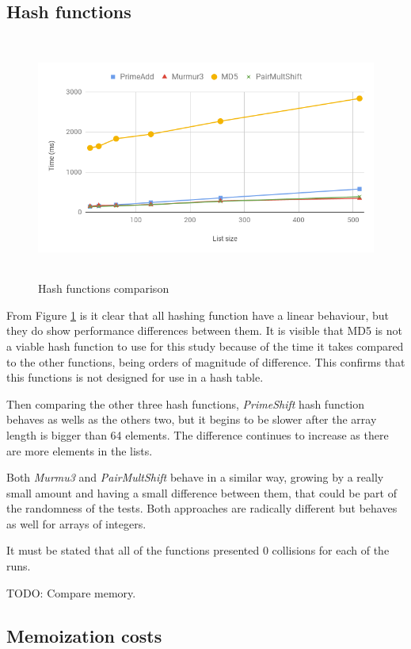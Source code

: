 \documentclass[a4paper,12pt]{article}
\begin{document}
\subsection{Hash functions}

\begin{figure}[H]
    \centering
    \includegraphics[height=8cm,keepaspectratio]{./images/hashes.png}
    \caption{Hash functions comparison}
    \label{fig:HashesFunc}
\end{figure}

From Figure \ref{fig:HashesFunc} is it clear that all hashing function have a linear behaviour, but they do show performance differences between them. It is visible that MD5 is not a viable hash function to use for this study because of the time it takes compared to the other functions, being orders of magnitude of difference. This confirms that this functions is not designed for use in a hash table.

Then comparing the other three hash functions, {\it PrimeShift} hash function behaves as wells as the others two, but it begins to be slower after the array length is bigger than 64 elements. The difference continues to increase as there are more elements in the lists.

Both {\it Murmu3} and {\it PairMultShift} behave in a similar way, growing by a really small amount and having a small difference between them, that could be part of the randomness of the tests. Both approaches are radically different but behaves as well for arrays of integers.

It must be stated that all of the functions presented 0 collisions for each of the runs.

TODO: Compare memory.

\subsection{Memoization costs}
\end{document}
